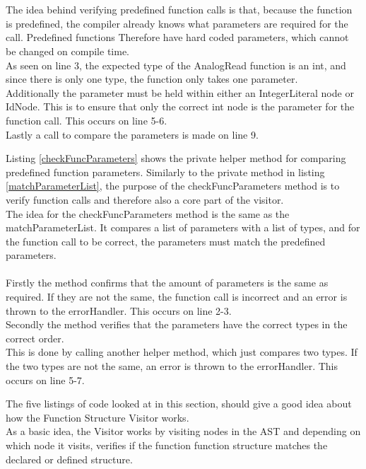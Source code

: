 \\\\
The idea behind verifying predefined function calls is that, because the function is predefined, the compiler already knows what parameters are required for the call. Predefined functions Therefore have hard coded parameters, which cannot be changed on compile time.\\
As seen on line 3, the expected type of the AnalogRead function is an int, and since there is only one type, the function only takes one parameter.\\
Additionally the parameter must be held within either an IntegerLiteral node or IdNode. This is to ensure that only the correct int node is the parameter for the function call. This occurs on line 5-6.\\
Lastly a call to compare the parameters is made on line 9.

\noindent\newline
Listing \ref{checkFuncParameters} shows the private helper method for comparing predefined function parameters. Similarly to the private method in listing \ref{matchParameterList}, the purpose of the checkFuncParameters method is to verify function calls and therefore also a core part of the visitor.\\
The idea for the checkFuncParameters method is the same as the matchParameterList. It compares a list of parameters with a list of types, and for the function call to be correct, the parameters must match the predefined parameters.
\\\\
Firstly the method confirms that the amount of parameters is the same as required. If they are not the same, the function call is incorrect and an error is thrown to the errorHandler. This occurs on line 2-3.\\
Secondly the method verifies that the parameters have the correct types in the correct order.\\
This is done by calling another helper method, which just compares two types. If the two types are not the same, an error is thrown to the errorHandler. This occurs on line 5-7.

\noindent\newline
The five listings of code looked at in this section, should give a good idea about how the Function Structure Visitor works.\\
As a basic idea, the Visitor works by visiting nodes in the AST and depending on which node it visits, verifies if the function function structure matches the declared or defined structure.
